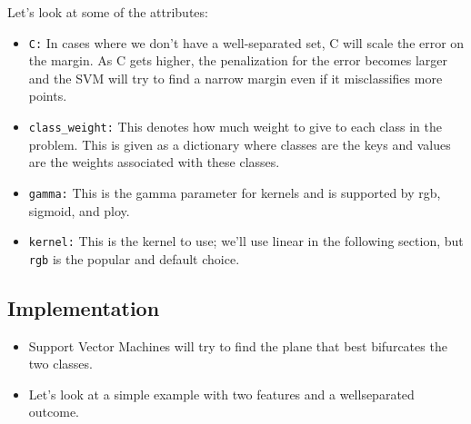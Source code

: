 \documentclass[SKL-MASTER.tex]{subfiles}
\begin{document}
Let's look at some of the attributes:
\begin{itemize}
\item  \texttt{C:} In cases where we don't have a well-separated set, C will scale the error on the
margin. As C gets higher, the penalization for the error becomes larger and the SVM
will try to find a narrow margin even if it misclassifies more points.
\item  \texttt{class\_weight:} This denotes how much weight to give to each class in the problem.
This is given as a dictionary where classes are the keys and values are the weights
associated with these classes.

\item  \texttt{gamma:} This is the gamma parameter for kernels and is supported by rgb, sigmoid,
and ploy.
\item  \texttt{kernel:} This is the kernel to use; we'll use linear in the following section, but \texttt{rgb} is the popular and default choice.
\end{itemize}

\subsection*{Implementation}
\begin{itemize}
\item Support Vector Machines will try to find the plane that best
bifurcates the two classes. 
\item Let's look at a simple example with two features and a wellseparated
outcome.
\end{itemize}
\end{document}
